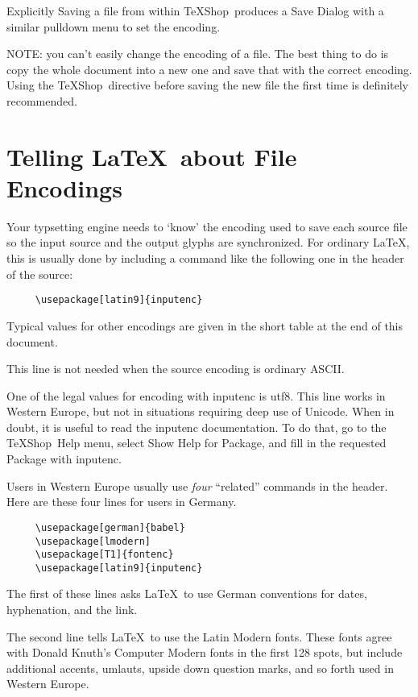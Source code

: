 \documentclass[letterpaper,11pt]{article}
\newcommand{\TS}{\textsf{\TeX Shop}}
\newcommand{\acr}[1]{\textsf{#1}}
\newcommand{\cmd}[1]{\textsf{#1}}
\newcommand{\mnu}[1]{\textsf{#1}}
\begin{document}
Explicitly Saving a file from within \TS\ produces a Save Dialog with a similar pulldown menu to set the encoding.

NOTE: you can't easily change the encoding of a file. The best thing to do is copy the whole document into a new one and save that with the correct encoding. Using the \TS\ directive before saving the new file the first time is definitely recommended.

\section{Telling \LaTeX\ about File Encodings}

Your typsetting engine needs to `know' the encoding used to save each source file so the input source and the output glyphs are synchronized. For ordinary LaTeX, this is usually
done by including a command like the following one in the header of the source:
\begin{verbatim}
     \usepackage[latin9]{inputenc}	
\end{verbatim}
Typical values for other encodings are given in the short table at the end of this
document.

This line is not needed when the source encoding is ordinary \acr{ASCII}. 

One of the legal values
for encoding with inputenc is \cmd{utf8}. This line works in Western Europe, but not in situations
requiring deep use of \cmd{Unicode}. When in doubt, it is useful to read the \cmd{inputenc} documentation. To do that, go to the \TS\ \mnu{Help} menu, select \cmd{Show Help for Package}, and
fill in the requested Package with \cmd{inputenc}.

Users in Western Europe usually use \emph{four} ``related'' commands in the header.
Here are these four lines for users in Germany.
\begin{verbatim}
     \usepackage[german]{babel}
     \usepackage[lmodern]
     \usepackage[T1]{fontenc}
     \usepackage[latin9]{inputenc}
\end{verbatim}

The first of these lines asks \LaTeX\ to use German conventions for dates, hyphenation, and the link. 

The second line tells \LaTeX\ to use the Latin Modern fonts. These fonts agree with Donald Knuth's Computer Modern fonts in the first 128 spots, but include additional accents, umlauts, upside down question marks, and so forth used in Western Europe.
\end{document}
